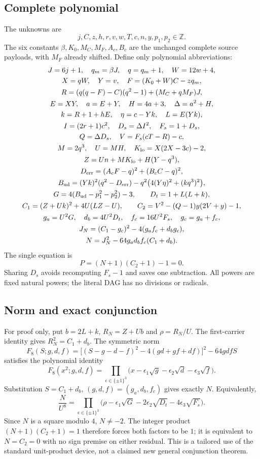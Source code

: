 \documentclass[11pt]{article}
\begin{document}
\subsection{Complete polynomial}
The unknowns are
\[
 j,C,z,h,r,v,w,T,c,n,y,p_1,p_2\in\mathbb Z.
\]
The six constants $\beta,K_0,M_C,M_F,A_c,B_c$ are the unchanged complete source
payloads, with $M_F$ already shifted. Define only polynomial abbreviations:
\begin{gather*}
 J=6j+1,\quad q_m=\beta J,\quad q=q_m+1,\quad W=12w+4,\\
 X=qW,\quad Y=v,\quad F=(K_0+W)C-zq_m,\\
 R=(q(q-F)-C)(q^2-1)+(M_C+qM_F)J,\\
 E=XY,\quad a=E+Y,\quad H=4a+3,\quad\Delta=a^2+H,\\
 k=R+1+hE,\quad \eta=c-Yk,\quad L=E(Yk),\\
 I=(2r+1)c^2,\quad D_s=\Delta I^2,\quad F_s=1+D_s,\\
 Q=\Delta D_s,\quad V=F_s(cT-R)-c,\\
 M=2q^3,\quad U=MH,\quad K_{\rm lo}=X(2X-3c)-2,\\
 Z=Un+MK_{\rm lo}+H(Y-q^3),\\
 D_{\rm err}=(A_cF-q)^2+(B_cC-q)^2,\\
 B_{\rm ud}=(Yk)^2(q^2-D_{\rm err})
       -q^2\bigl(4(Y\eta)^2+(kq^3)^2\bigr),\\
 G=4(B_{\rm ud}-p_1^2-p_2^2)-3,\qquad D_t=1+L(L+k),\\
 C_1=(Z+Uk)^2+4U(LZ-U),\qquad
 C_2=V^2-(Q-1)y(2V+y)-1,\\
 g_a=U^2G,\quad d_b=4U^2D_t,\quad f_c=16U^2F_s,\quad g_c=g_a+f_c,\\
 J_N=(C_1-g_c)^2-4(g_af_c+d_bg_c),\\
 N=J_N^2-64g_ad_bf_c(C_1+d_b).
\end{gather*}
The single equation is
\[
 \boxed{P=(N+1)(C_2+1)-1=0.}
\]
Sharing $D_s$ avoids recomputing $F_s-1$ and saves one subtraction. All powers
are fixed natural powers; the literal DAG has no divisions or radicals.

\subsection{Norm and exact conjunction}
For proof only, put $b=2L+k$, $R_N=Z+Ub$ and $\rho=R_N/U$.
The first-carrier identity gives $R_N^2=C_1+d_b$. The symmetric norm
\[
 F_8(S;g,d,f)=\bigl[(S-g-d-f)^2-4(gd+gf+df)\bigr]^2-64gdfS
\]
satisfies the polynomial identity
\[
 F_8(x^2;g,d,f)=\prod_{\epsilon\in\{\pm1\}^3}
   \bigl(x-\epsilon_1\sqrt g-\epsilon_2\sqrt d-\epsilon_3\sqrt f\bigr).
\]
Substitution $S=C_1+d_b$, $(g,d,f)=(g_a,d_b,f_c)$ gives exactly $N$.
Equivalently,
\[
 \frac{N}{U^8}=\prod_{\epsilon\in\{\pm1\}^3}
 \bigl(\rho-\epsilon_1\sqrt G-2\epsilon_2\sqrt{D_t}
                         -4\epsilon_3\sqrt{F_s}\bigr). \tag{T1}
\]
Since $N$ is a square modulo $4$, $N\ne-2$. The integer product
$(N+1)(C_2+1)=1$ therefore forces both factors to be $1$; it is equivalent to
$N=C_2=0$ with no sign premise on either residual. This is a tailored use of the
standard unit-product device, not a claimed new general conjunction theorem.
\end{document}
